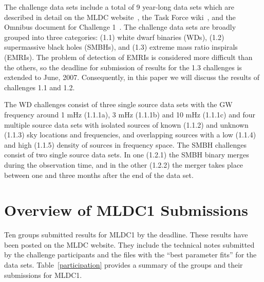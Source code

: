 \documentclass[12pt]{iopart}
\begin{document}
The challenge data sets include a total of 9 year-long data sets which are described in detail on the MLDC website~\cite{MLDCweb}, the Task Force wiki~\cite{MLDCwiki}, and the Omnibus document for Challenge 1~\cite{MLDCdoc}. The challenge data sets are broadly grouped into three categories: (1.1) white dwarf binaries (WDs), (1.2) supermassive black holes (SMBHs), and (1.3) extreme mass ratio inspirals (EMRIs). The problem of detection of EMRIs is considered more difficult than the others, so the deadline for submission of results for the 1.3 challenges is extended to June, 2007. Consequently, in this paper we will discuss the results of challenges 1.1 and 1.2.

The WD challenges consist of three single source data sets with the GW frequency around 1 mHz (1.1.1a), 3 mHz (1.1.1b) and 10 mHz (1.1.1c) and four multiple source data sets with isolated sources of known (1.1.2) and unknown (1.1.3) sky locations and frequencies, and overlapping sources with a low (1.1.4) and high (1.1.5) density of sources in frequency space. The SMBH challenges consist of two single source data sets. In one (1.2.1) the SMBH binary merges during the observation time, and in the other (1.2.2) the merger takes place between one and three months after the end of the data set.

\section{Overview of MLDC1 Submissions}

Ten groups submitted results for MLDC1 by the deadline. These results have been posted on the MLDC website. They include the technical notes submitted by the challenge participants and the files with the ``best parameter fits'' for the data sets. Table~\ref{participation} provides a summary of the groups and their submissions for MLDC1.
\end{document}
